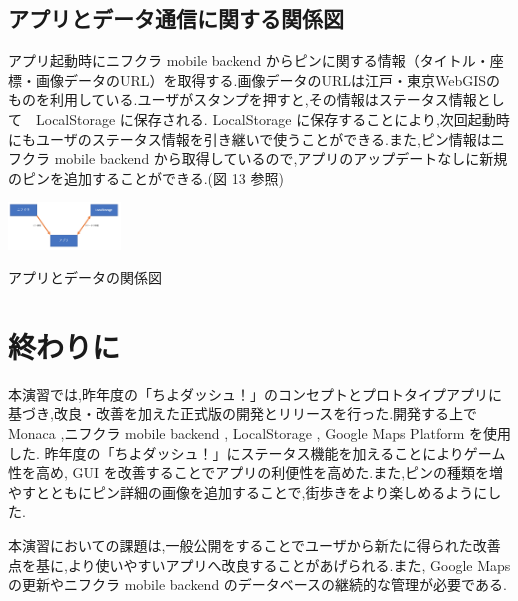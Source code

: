\documentclass[a4paper, twoside]{jarticle}
\makeatletter
\newenvironment{figurehere}
  {\def\@captype{figure}}
  {}
\makeatother
\begin{document}
\begin{multicols}{2}
\subsection{アプリとデータ通信に関する関係図}
アプリ起動時にニフクラ mobile backend からピンに関する情報（タイトル・座標・画像データのURL）を取得する.画像データのURLは江戸・東京WebGISのものを利用している.ユーザがスタンプを押すと,その情報はステータス情報として　LocalStorage に保存される. LocalStorage に保存することにより,次回起動時にもユーザのステータス情報を引き継いで使うことができる.また,ピン情報はニフクラ mobile backend から取得しているので,アプリのアップデートなしに新規のピンを追加することができる.(図 13 参照)
\begin{figurehere}
\begin{center}
\includegraphics[bb=30 100 550 500,width=3cm]{./image12.png}%
\end{center}
\caption{アプリとデータの関係図}\label{fig:13}
\end{figurehere}


\section{終わりに}
本演習では,昨年度の「ちよダッシュ！」のコンセプトとプロトタイプアプリに基づき,改良・改善を加えた正式版の開発とリリースを行った.開発する上で Monaca ,ニフクラ mobile backend , LocalStorage , Google Maps Platform を使用した.
昨年度の「ちよダッシュ！」にステータス機能を加えることによりゲーム性を高め, GUI を改善することでアプリの利便性を高めた.また,ピンの種類を増やすとともにピン詳細の画像を追加することで,街歩きをより楽しめるようにした.\par
本演習においての課題は,一般公開をすることでユーザから新たに得られた改善点を基に,より使いやすいアプリへ改良することがあげられる.また, Google Maps の更新やニフクラ mobile backend のデータベースの継続的な管理が必要である.



\end{multicols} %
\vspace{1cm}
\end{document}
